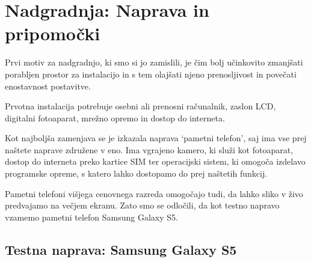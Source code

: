\documentclass[a4paper, 12pt]{book}
\begin{document}
\chapter{Nadgradnja: Naprava in pripomočki}
\label{ch:nadgradnjaNaprava}
Prvi motiv za nadgradnjo, ki smo si jo zamislili, je čim bolj učinkovito zmanjšati
porabljen prostor za instalacijo in s tem olajšati njeno prenosljivost in
povečati enostavnost postavitve.

Prvotna instalacija potrebuje osebni ali prenosni računalnik, zaslon LCD,
digitalni fotoaparat, mrežno opremo in dostop do interneta.

Kot najboljša zamenjava se je izkazala naprava `pametni telefon', saj ima
vse prej naštete naprave združene v eno. Ima vgrajeno kamero, ki služi kot
fotoaparat, dostop do interneta preko kartice SIM ter operacijski sistem, ki
omogoča izdelavo programske opreme, s katero lahko dostopamo do prej naštetih
funkcij.

Pametni telefoni višjega cenovnega razreda omogočajo tudi, da lahko sliko v živo
predvajamo na večjem ekranu. Zato smo se odločili, da kot testno napravo
vzamemo pametni telefon Samsung Galaxy S5.

\section{Testna naprava: Samsung Galaxy S5}
\label{sec:testnaNapravaSmartPhone}
\end{document}
